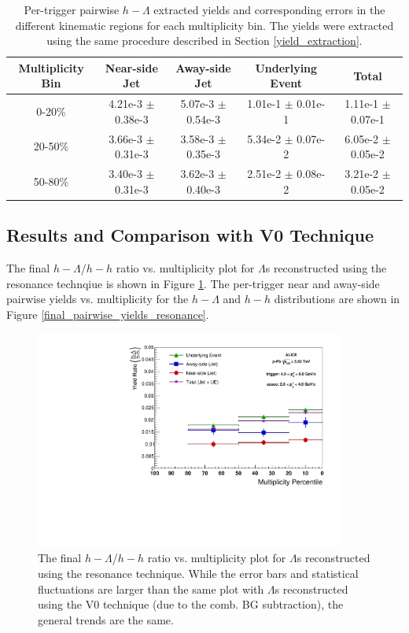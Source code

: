 \documentclass[ALICE,manyauthors]{ALICE_analysis_notes}
\begin{document}
\begin{table}[h!]
\centering
\begin{tabular}{| c | c | c | c | c | }
\hline
Multiplicity Bin & Near-side Jet & Away-side Jet & Underlying Event & Total  \\
\hline
0-20\% & 4.21e-3 $\pm$ 0.38e-3 &  5.07e-3 $\pm$ 0.54e-3 & 1.01e-1 $\pm$ 0.01e-1 & 1.11e-1 $\pm$ 0.07e-1 \\
20-50\% & 3.66e-3 $\pm$ 0.31e-3 & 3.58e-3 $\pm$ 0.35e-3 & 5.34e-2 $\pm$ 0.07e-2 & 6.05e-2 $\pm$ 0.05e-2 \\
50-80\% & 3.40e-3 $\pm$ 0.31e-3 & 3.62e-3 $\pm$ 0.40e-3 & 2.51e-2 $\pm$ 0.08e-2 & 3.21e-2 $\pm$ 0.05e-2 \\
\hline
\end{tabular}
\caption{Per-trigger pairwise $h-\Lambda$ extracted yields and corresponding errors in the different kinematic regions for each multiplicity bin. The yields were extracted using the same procedure described in Section \ref{yield_extraction}.}
\label{yield_table_resonance}
\end{table}

\subsection{Results and Comparison with V0 Technique}
The final $h-\Lambda$/$h-h$ ratio vs. multiplicity plot for $\Lambda$s reconstructed using the resonance technqiue is shown in Figure \ref{final_ratio_resonance}. The per-trigger near and away-side pairwise yields vs. multiplicity for the $h-\Lambda$ and $h-h$ distributions are shown in Figure \ref{final_pairwise_yields_resonance}.

\begin{figure}[ht]
\centering
\includegraphics[width=4in]{figures/resonance_ratio_plot_2_4.pdf}
\caption{The final $h-\Lambda$/$h-h$ ratio vs. multiplicity plot for $\Lambda$s reconstructed using the resonance technique. While the error bars and statistical fluctuations are larger than the same plot with $\Lambda$s reconstructed using the V0 technique (due to the comb. BG subtraction), the general trends are the same.}
\label{final_ratio_resonance}
\end{figure}
\end{document}
